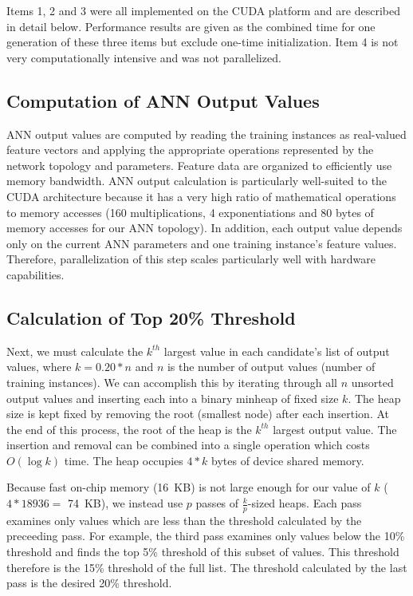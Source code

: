 \documentclass[11pt]{article}       %
\begin{document}
Items 1, 2 and 3 were all implemented on the CUDA platform and are described in detail below. Performance results are given as the combined time for one generation of these three items but exclude one-time initialization. Item 4 is not very computationally intensive and was not parallelized. 

\subsection{Computation of ANN Output Values} \label{ANNcomp}
ANN output values are computed by reading the training instances as real-valued feature vectors and applying the appropriate operations represented by the network topology and parameters. Feature data are organized to efficiently use memory bandwidth. ANN output calculation is particularly well-suited to the CUDA architecture because it has a very high ratio of mathematical operations to memory accesses (160 multiplications, 4 exponentiations and 80 bytes of memory accesses for our ANN topology). In addition, each output value depends only on the current ANN parameters and one training instance's feature values. Therefore, parallelization of this step scales particularly well with hardware capabilities.

\subsection{Calculation of Top 20\% Threshold} \label{top20}
Next, we must calculate the $k^{th}$ largest value in each candidate's list of output values, where $k = 0.20 * n$ and $n$ is the number of output values (number of training instances). We can accomplish this by iterating through all $n$ unsorted output values and inserting each into a binary minheap of fixed size $k$. The heap size is kept fixed by removing the root (smallest node) after each insertion. At the end of this process, the root of the heap is the $k^{th}$ largest output value. The insertion and removal can be combined into a single operation which costs $O(\log k)$ time. The heap occupies $4 * k$ bytes of device shared memory.

Because fast on-chip memory (16~KB) is not large enough for our value of $k$ ($4 * 18936 =$ 74~KB), we instead use $p$ passes of $\frac{k}{p}$-sized heaps. Each pass examines only values which are less than the threshold calculated by the preceeding pass. For example, the third pass examines only values below the 10\% threshold and finds the top 5\% threshold of this subset of values. This threshold therefore is the 15\% threshold of the full list. The threshold calculated by the last pass is the desired 20\% threshold.
\end{document}

